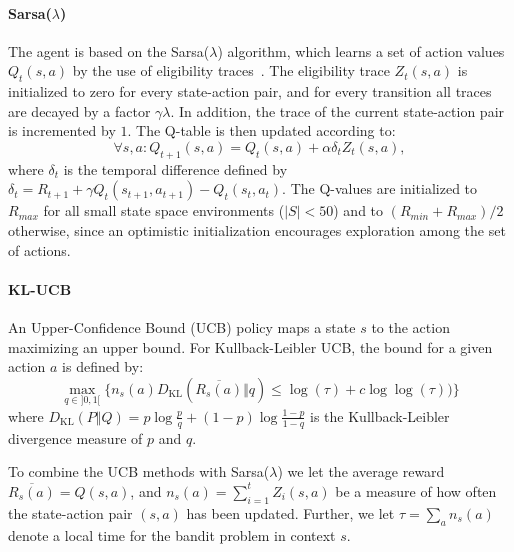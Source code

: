 
\paragraph{Sarsa($\lambda$)}
The agent is based on the Sarsa($\lambda$) algorithm, which learns a set of
action values $Q_t(s,a)$ by the use of eligibility
traces~\cite{Sutton:1998:IRL:551283}. The eligibility trace $Z_t(s,a)$ is
initialized to zero for every state-action pair, and for every transition all
traces are decayed by a factor $\gamma\lambda$. In addition, the trace of the
current state-action pair is incremented by $1$. The Q-table is then updated
according to:
\begin{equation}
        \forall s,a : Q_{t+1}(s,a) = Q_t(s,a) + \alpha\delta_t Z_t(s,a),
\end{equation}
where $\delta_t$ is the temporal difference defined by $\delta_t = R_{t+1} +
\gamma Q_t(s_{t+1},a_{t+1}) - Q_t(s_t,a_t)$. The Q-values are initialized to
$R_{max}$ for all small state space environments ($\vert{S}\vert < 50$) and to
$(R_{min}+R_{max})/2$ otherwise, since an optimistic initialization encourages
exploration among the set of actions.

\paragraph{KL-UCB}
An Upper-Confidence Bound (UCB) policy maps a state $s$ to the action maximizing
an upper bound. For Kullback-Leibler UCB, the bound for a given action $a$ is
defined by:
\begin{equation}
    \max_{q \in ]0,1[}\big\{n_s(a)
        D_{\mathrm{KL}}\left(\overline{R_s(a)}\Big\Vert{q}\right) \le \log(\tau) +
        c\log\log(\tau))\big\}
\end{equation}
where $D_\mathrm{KL}(P\Vert{Q}) = p \log \frac{p}{q}+(1-p)\log\frac{1-p}{1-q}$
is the Kullback-Leibler divergence measure of $p$ and
$q$.~\cite{garivier2011kl}

To combine the UCB methods with Sarsa($\lambda$) we let the average reward
$\overline{R_s(a)}=Q(s,a)$, and $n_s(a)=\sum_{i=1}^tZ_i(s,a)$ be a measure of
how often the state-action pair $(s,a)$ has been updated. Further, we let $\tau
= \sum_a{n_s(a)}$ denote a local time for the bandit problem in context $s$.




